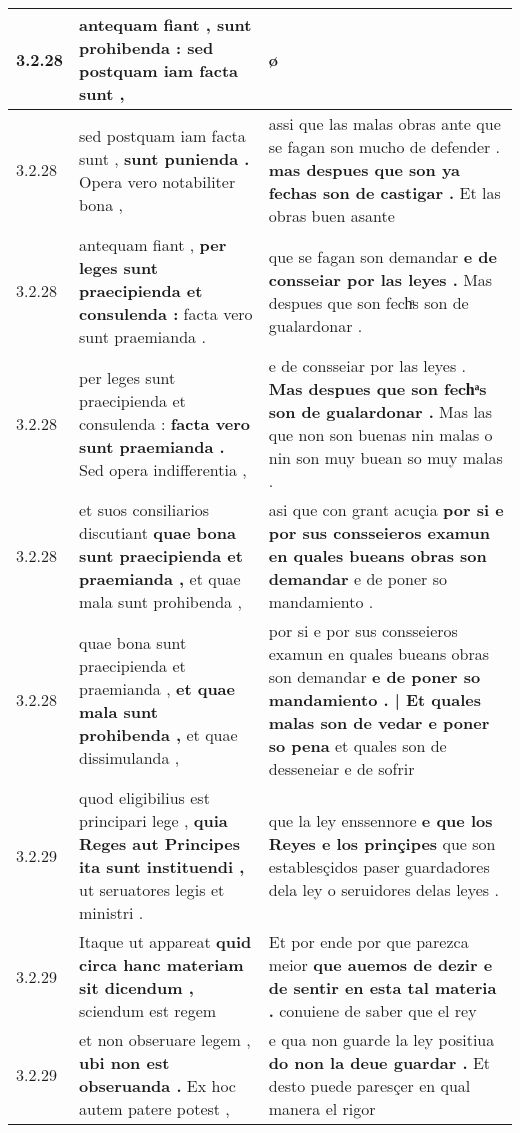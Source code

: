 \begin{tabular}{|p{1cm}|p{6.5cm}|p{6.5cm}|}
3.2.28 & antequam fiant , \textbf{ sunt prohibenda : } sed postquam iam facta sunt , & ø \\\hline
3.2.28 & sed postquam iam facta sunt , \textbf{ sunt punienda . } Opera vero notabiliter bona , & assi que las malas obras ante que se fagan son mucho de defender . \textbf{ mas despues que son ya fechas son de castigar . } Et las obras buen asante \\\hline
3.2.28 & antequam fiant , \textbf{ per leges sunt praecipienda et consulenda : } facta vero sunt praemianda . & que se fagan son demandar \textbf{ e de consseiar por las leyes . } Mas despues que son fechͣs son de gualardonar . \\\hline
3.2.28 & per leges sunt praecipienda et consulenda : \textbf{ facta vero sunt praemianda . } Sed opera indifferentia , & e de consseiar por las leyes . \textbf{ Mas despues que son fechͣs son de gualardonar . } Mas las que non son buenas nin malas o nin son muy buean so muy malas . \\\hline
3.2.28 & et suos consiliarios discutiant \textbf{ quae bona sunt praecipienda et praemianda , } et quae mala sunt prohibenda , & asi que con grant acuçia \textbf{ por si e por sus consseieros examun en quales bueans obras son demandar } e de poner so mandamiento . \\\hline
3.2.28 & quae bona sunt praecipienda et praemianda , \textbf{ et quae mala sunt prohibenda , } et quae dissimulanda , & por si e por sus consseieros examun en quales bueans obras son demandar \textbf{ e de poner so mandamiento . | Et quales malas son de vedar e poner so pena } et quales son de desseneiar e de sofrir \\\hline
3.2.29 & quod eligibilius est principari lege , \textbf{ quia Reges aut Principes ita sunt instituendi , } ut seruatores legis et ministri . & que la ley enssennore \textbf{ e que los Reyes e los prinçipes } que son establesçidos paser guardadores dela ley o seruidores delas leyes . \\\hline
3.2.29 & Itaque ut appareat \textbf{ quid circa hanc materiam sit dicendum , } sciendum est regem & Et por ende por que parezca meior \textbf{ que auemos de dezir e de sentir en esta tal materia . } conuiene de saber que el rey \\\hline
3.2.29 & et non obseruare legem , \textbf{ ubi non est obseruanda . } Ex hoc autem patere potest , & e qua non guarde la ley positiua \textbf{ do non la deue guardar . } Et desto puede paresçer en qual manera el rigor \\\hline

\end{tabular}
